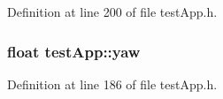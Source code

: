 Definition at line 200 of file test\-App.\-h.

\hypertarget{group___wii_mote_variables_ga865985f78dd5def3ed20c87b9fc772b6}{
\subsubsection[{yaw}]{\setlength{\rightskip}{0pt plus 5cm}float test\-App\-::yaw}}\label{group___wii_mote_variables_ga865985f78dd5def3ed20c87b9fc772b6}


Definition at line 186 of file test\-App.\-h.

